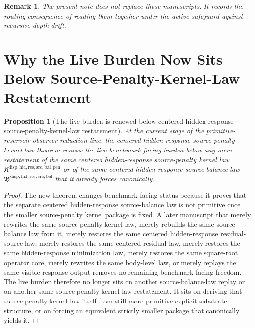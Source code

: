 \documentclass[11pt]{article}
\newcommand{\SourcePenaltyKernelLawPackage}{\mathfrak K^{\mathrm{disp,hid,res,src,bal,pen}}}
\newcommand{\SourceBalanceLawPackage}{\mathfrak B^{\mathrm{disp,hid,res,src,bal}}}
\newtheorem{proposition}{Proposition}
\newtheorem{remark}{Remark}
\begin{document}
\begin{remark}
The present note does not replace those manuscripts. It records the routing consequence of reading them together under the active safeguard against recursive depth drift.
\end{remark}

\section{Why the Live Burden Now Sits Below Source-Penalty-Kernel-Law Restatement}

\begin{proposition}[The live burden is renewed below centered-hidden-response-source-penalty-kernel-law restatement]
At the current stage of the primitive-reservoir observer-reduction line, the centered-hidden-response-source-penalty-kernel-law theorem renews the live benchmark-facing burden below any mere restatement of the same centered hidden-response source-penalty kernel law \(\SourcePenaltyKernelLawPackage\) or of the same centered hidden-response source-balance law \(\SourceBalanceLawPackage\) that it already forces canonically.
\end{proposition}

\begin{proof}
The new theorem changes benchmark-facing status because it proves that the separate centered hidden-response source-balance law is not primitive once the smaller source-penalty kernel package is fixed. A later manuscript that merely rewrites the same source-penalty kernel law, merely rebuilds the same source-balance law from it, merely restores the same centered hidden-response residual-source law, merely restores the same centered residual law, merely restores the same hidden-response minimization law, merely restores the same square-root operator core, merely rewrites the same body-level law, or merely replays the same visible-response output removes no remaining benchmark-facing freedom. The live burden therefore no longer sits on another source-balance-law replay or on another same-source-penalty-kernel-law restatement. It sits on deriving that source-penalty kernel law itself from still more primitive explicit substrate structure, or on forcing an equivalent strictly smaller package that canonically yields it.
\end{proof}
\end{document}
